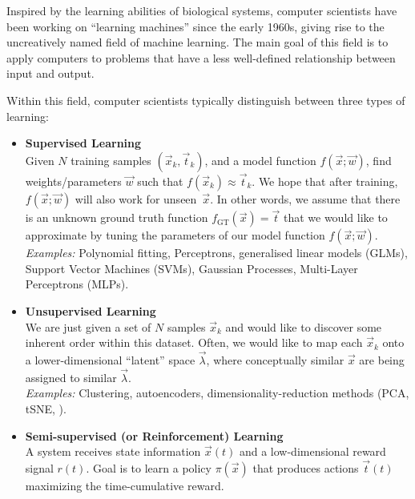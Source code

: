 \documentclass[10pt,letterpaper,oneside]{article}
\begin{document}
Inspired by the learning abilities of biological systems, computer scientists have been working on \enquote{learning machines} since the early 1960s, giving rise to the uncreatively named field of machine learning. The main goal of this field is to apply computers to problems that have a less well-defined relationship between input and output.


\newpage

Within this field, computer scientists typically distinguish between three types of learning:
\begin{itemize}
	\item \textbf{Supervised Learning}\\
	Given $N$ training samples $(\vec x_k, \vec t_k)$, and a model function $f(\vec x; \vec w)$, find weights/parameters $\vec w$ such that $f(\vec x_k) \approx \vec t_k$. We hope that after training, $f(\vec x; \vec w)$ will also work for unseen~$\vec x$. In other words, we assume that there is an unknown ground truth function $f_\mathrm{GT}(\vec x) = \vec t$ that we would like to approximate by tuning the parameters of our model function $f(\vec x; \vec w)$.\\
	\emph{Examples:} Polynomial fitting, Perceptrons, generalised linear models (GLMs), Support Vector Machines (SVMs), Gaussian Processes, Multi-Layer Perceptrons (MLPs).
	\item \textbf{Unsupervised Learning}\\
	We are just given a set of $N$ samples $\vec x_k$ and would like to discover some inherent order within this dataset. Often, we would like to map each $\vec x_k$ onto a lower-dimensional \enquote{latent} space $\vec \lambda$, where conceptually similar $\vec x$ are being assigned to similar $\vec \lambda$.\\
	\emph{Examples:} Clustering, autoencoders, dimensionality-reduction methods (PCA, tSNE, \textellipsis).
	\item \textbf{Semi-supervised (or Reinforcement) Learning}\\
	A system receives state information $\vec x(t)$ and a low-dimensional reward signal $r(t)$. Goal is to learn a policy $\pi(\vec x)$ that produces actions $\vec t(t)$ maximizing the time-cumulative reward.
\end{itemize}
\end{document}
